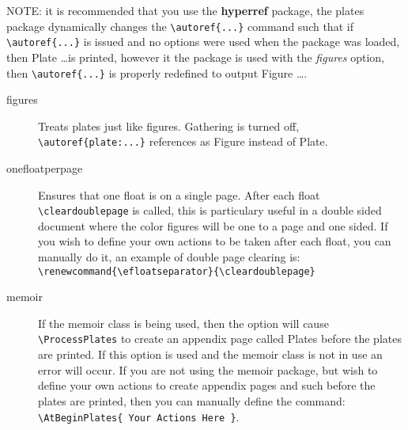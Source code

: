 \documentclass{article}
\begin{document}
NOTE: it is recommended that you use the \textbf{hyperref}
package, the plates package dynamically changes the
\lstinline!\autoref{...}! command such that if
\lstinline!\autoref{...}! is issued and no options were used when
the package was loaded, then Plate \ldots is printed, however it
the package is used with the \emph{figures} option, then
\lstinline!\autoref{...}! is properly redefined to output Figure
\ldots.

\bigskip

\begin{description}
  \item[figures] Treats plates just like figures.  Gathering is
  turned off, \lstinline!\autoref{plate:...}! references as Figure
  instead of Plate.
  \item[onefloatperpage] Ensures that one float is on a single
  page.  After each float \lstinline!\cleardoublepage! is called, this is particulary
  useful in a double sided document where the color figures will
  be one to a page and
  one sided.
  If you wish to define your own actions to be taken after each
  float, you can manually do it, an example of double page
  clearing is:\\
  \lstinline!\renewcommand{\efloatseparator}{\cleardoublepage}!
  \item[memoir] If the memoir class is being used, then the option
  will cause \lstinline!\ProcessPlates! to create an appendix
  page called Plates before the plates are printed.  If this
  option is used and the memoir class is not in use an error will
  occur.  If you are not using the memoir package, but wish to
  define your own actions to create appendix pages and such before the
  plates are printed,  then you can manually define the
  command: \lstinline!\AtBeginPlates{ Your Actions Here }!.
\end{description}

\bigskip
\end{document}
